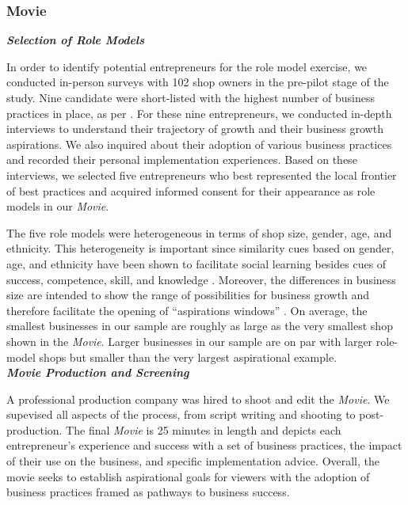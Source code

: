 \documentclass[11.5pt]{article}
\begin{document}
\subsubsection{Movie}

\emph{\textbf{Selection of Role Models}}\

\noindent In order to identify potential entrepreneurs for the role model exercise, we conducted in-person surveys with 102 shop owners in the pre-pilot stage of the study. Nine candidate were short-listed with the highest number of business practices in place, as per \citet{McKenzie2017}. For these nine entrepreneurs, we conducted in-depth interviews to understand their trajectory of growth and their business growth aspirations. We also inquired about their adoption of various business practices and recorded their  personal implementation experiences. Based on these interviews, we selected five entrepreneurs who best represented the local frontier of best practices and acquired informed consent for their appearance as role models in our \emph{Movie}.

The five role models were heterogeneous in terms of shop size, gender, age, and ethnicity. This heterogeneity is important since similarity cues based on gender, age, and ethnicity have been shown to facilitate social learning besides cues of success, competence, skill, and knowledge \citep[see, e.g.,][]{Rendell2011, Efferson2008, Chudek2013, Henrich2001, Corriveau2009, McElreath2008}. Moreover, the differences in business size are intended to show the range of possibilities for business growth and therefore facilitate the opening of ``aspirations windows'' \citep{Ray2006}. On average, the smallest businesses in our sample are roughly as large as the very smallest shop shown in the \emph{Movie}. Larger businesses in our sample are on par with larger role-model shops but smaller than the very largest aspirational example.\\

\noindent \emph{\textbf{Movie Production and Screening}}\

\noindent A professional production company was hired to shoot and edit the \emph{Movie}. We supevised all aspects of the process, from script writing and shooting to post-production. The final \emph{Movie} is 25 minutes in length and depicts each entrepreneur's experience and success with a set of business practices, the impact of their use on the business, and specific implementation advice. Overall, the movie seeks to establish aspirational goals for viewers with the adoption of business practices framed as pathways to business success.
\end{document}
